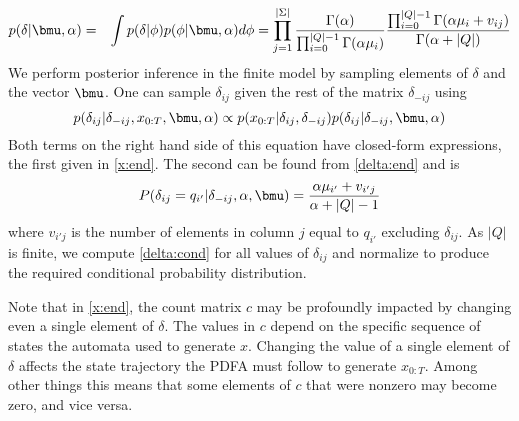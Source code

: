  \begin{eqnarray}
 p(\delta|\bmu,\alpha) & = & \int p(\delta|\phi)p(\phi|\bmu,\alpha) d\phi %
   =   \prod_{j=1}^{|\Sigma|} \frac{\Gamma(\alpha)}{\prod_{i=0}^{|Q|-1}\Gamma(\alpha\mu_i)} \frac{\prod_{i=0}^{|Q|-1} \Gamma(\alpha\mu_i + v_{ij})}{\Gamma(\alpha + |Q|)} \label{delta:end}
  \end{eqnarray}
%
% 
We perform posterior inference in the finite model by sampling elements of $\delta$ and the vector $\bmu$.  %
One can sample $\delta_{ij}$ given the rest of the matrix $\delta_{-ij}$ using 
%
\begin{equation}
p(\delta_{ij}|\delta_{-ij},x_{0:T},\bmu,\alpha) \propto p(x_{0:T}|\delta_{ij},\delta_{-ij})p(\delta_{ij}|\delta_{-ij},\bmu,\alpha) \label{delta:cond}
\end{equation}
%
Both terms on the right hand side of this equation have closed-form expressions, the first given in \eqref{x:end}.  The second can be found from \eqref{delta:end} and is
%
\begin{equation}
P(\delta_{ij} = q_{i'}|\delta_{-ij},\alpha,\bmu) = \frac{\alpha\mu_{i'} + v_{i'j}}{\alpha + |Q| - 1} \label{delta:pred}
\end{equation}
%
where $v_{i'j}$ is the number of elements in column $j$ equal to $q_{i'}$  excluding $\delta_{ij}$.  As $|Q|$ is finite, we compute \eqref{delta:cond} for all values of $\delta_{ij}$ and normalize to produce the required conditional probability distribution.

Note that in \eqref{x:end}, the count matrix $c$ may be profoundly impacted by changing even a single element of $\delta$.  The values in $c$ depend on the specific sequence of states the automata used to generate $x$.  Changing the value of a single element of $\delta$ affects the state trajectory the PDFA must follow to generate $x_{0:T}$.  %
 Among other things this means that some elements of $c$ that were nonzero may become zero, and vice versa.

